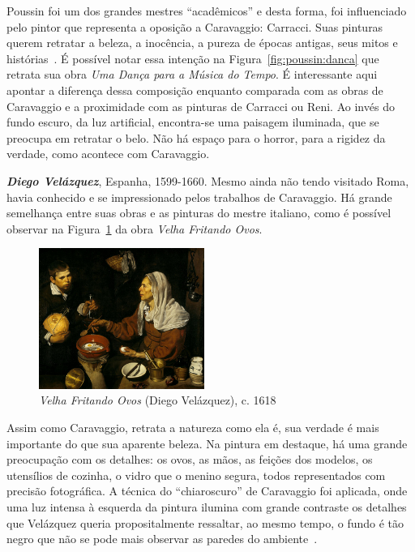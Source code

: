 Poussin foi um dos grandes mestres ``acadêmicos'' e desta forma, foi
influenciado pelo pintor que representa a oposição a Caravaggio:
Carracci. Suas pinturas querem retratar a beleza, a inocência, a
pureza de épocas antigas, seus mitos e histórias~\cite{unglaub}. É
possível notar essa intenção na Figura~\ref{fig:poussin:danca} que
retrata sua obra \textit{Uma Dança para a Música do Tempo}. É
interessante aqui apontar a diferença dessa composição enquanto
comparada com as obras de Caravaggio e a proximidade com as pinturas
de Carracci ou Reni. Ao invés do fundo escuro, da luz artificial,
encontra-se uma paisagem iluminada, que se preocupa em retratar o
belo. Não há espaço para o horror, para a rigidez da verdade, como
acontece com Caravaggio.


\textbf{\emph{Diego Velázquez}}, Espanha, 1599-1660. Mesmo ainda não tendo
visitado Roma, havia conhecido e se impressionado pelos trabalhos de
Caravaggio. Há grande semelhança entre suas obras e as pinturas do mestre
italiano, como é possível observar na Figura~\ref{fig:velazquez:velha} da obra
\textit{Velha Fritando Ovos}. 

\begin{figure}
  \begin{center}
    \includegraphics[width=0.48\textwidth]{figs/velazquez_velha.png}
  \end{center}
  \caption{\emph{Velha Fritando Ovos} (Diego Velázquez), c. 1618}
  \label{fig:velazquez:velha}
\end{figure}

Assim como Caravaggio, retrata a natureza como ela
é, sua verdade é mais importante do que sua aparente beleza. Na pintura em
destaque, há uma grande preocupação com os detalhes: os ovos, as mãos, as
feições dos modelos, os utensílios de cozinha, o vidro que o menino segura,
todos representados com precisão fotográfica. A técnica do ``chiaroscuro'' de
Caravaggio foi aplicada, onde uma luz intensa à esquerda da pintura ilumina com
grande contraste os detalhes que Velázquez queria propositalmente ressaltar, ao
mesmo tempo, o fundo é tão negro que não se pode mais observar as paredes do
ambiente~\cite{gombrich}.

